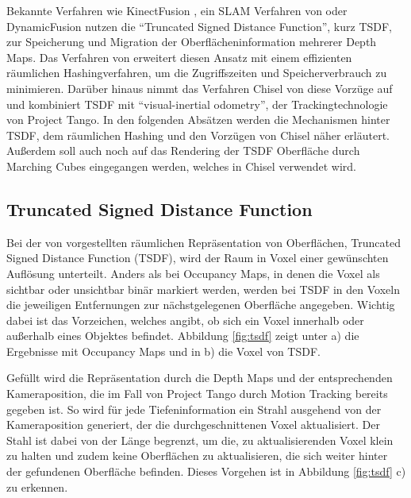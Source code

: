 Bekannte Verfahren wie KinectFusion \citep{newcombe2011kinectfusion}, ein SLAM Verfahren von \citet{bylow2013real} oder DynamicFusion \citep{newcombe2015dynamicfusion} nutzen die \enquote{Truncated Signed Distance Function}, kurz TSDF, zur Speicherung und Migration der Oberflächeninformation mehrerer Depth Maps. Das Verfahren von \citet{niessner2013real} erweitert diesen Ansatz mit einem effizienten räumlichen Hashingverfahren, um die Zugriffszeiten und Speicherverbrauch zu minimieren. Darüber hinaus nimmt das Verfahren Chisel von \citep{Klingensmith_2015_7924} diese Vorzüge auf und kombiniert TSDF mit \enquote{visual-inertial odometry}, der Trackingtechnologie von Project Tango. In den folgenden Absätzen werden die Mechanismen hinter TSDF, dem räumlichen Hashing und den Vorzügen von Chisel näher erläutert. Außerdem soll auch noch auf das Rendering der TSDF Oberfläche durch Marching Cubes eingegangen werden, welches in Chisel verwendet wird. 


\subsection{Truncated Signed Distance Function}

Bei der von \citet{curless1996volumetric} vorgestellten räumlichen Repräsentation von Oberflächen, Truncated Signed Distance Function (TSDF), wird der Raum in Voxel einer gewünschten Auflösung unterteilt. Anders als bei Occupancy Maps, in denen die Voxel als sichtbar oder unsichtbar binär markiert werden, werden bei TSDF in den Voxeln die jeweiligen Entfernungen zur nächstgelegenen Oberfläche angegeben. Wichtig dabei ist das Vorzeichen, welches angibt, ob sich ein Voxel innerhalb oder außerhalb eines Objektes befindet. Abbildung \ref{fig:tsdf} zeigt unter a) die Ergebnisse mit Occupancy Maps und in b) die Voxel von TSDF. \citep{curless1996volumetric} 

Gefüllt wird die Repräsentation durch die Depth Maps und der entsprechenden Kameraposition, die im Fall von Project Tango durch Motion Tracking bereits gegeben ist. So wird für jede Tiefeninformation ein Strahl ausgehend von der Kameraposition generiert, der die durchgeschnittenen Voxel aktualisiert. Der Stahl ist dabei von der Länge begrenzt, um die, zu aktualisierenden Voxel klein zu halten und zudem keine Oberflächen zu aktualisieren, die sich weiter hinter der gefundenen Oberfläche befinden. Dieses Vorgehen ist in Abbildung \ref{fig:tsdf} c) zu erkennen. \citep{Compu66:online} 

